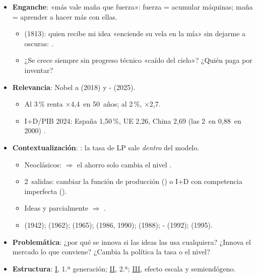 \documentclass{article}
\begin{document}
\cabecerarepaso
\begin{columnas}

\begin{itemize}
\item \textbf{Enganche}: «más vale maña que fuerza»: fuerza = acumular máquinas; maña = aprender a hacer más con ellas.
  \begin{itemize}
  \item {} (1813): quien recibe mi idea «enciende su vela en la mía» sin dejarme a oscuras: .
  \item ¿Se crece siempre sin progreso técnico «caído del cielo»? ¿Quién paga por inventar?
  \end{itemize}
\item \textbf{Relevancia}: Nobel a  (2018) y - (2025).
  \begin{itemize}
  \item Al 3\,\% renta ×4,4~en 50~años; al 2\,\%, ×2,7.
  \item I+D/PIB 2024: España 1,50\,\%, UE 2,26, China 2,69 (las 2~en 0,88~en 2000) .
  \end{itemize}
\item \textbf{Contextualización}: : la tasa de LP sale \emph{dentro} del modelo.
  \begin{itemize}
  \item Neoclásicos:  $\Rightarrow$ el ahorro solo cambia el nivel .
  \item 2~salidas: cambiar la función de producción () o I+D con competencia imperfecta ().
  \item Ideas  y parcialmente  $\Rightarrow$  .
  \item {} (1942);  (1962);  (1965);  (1986, 1990);  (1988); - (1992);  (1995).
  \end{itemize}
\item \textbf{Problemática}: ¿por qué se innova si las ideas las usa cualquiera? ¿Innova el mercado lo que conviene? ¿Cambia la política la tasa o el nivel?
\item \textbf{Estructura}: \hyperref[rep:I]{I}, 1.ª generación; \hyperref[rep:II]{II}, 2.ª; \hyperref[rep:III]{III}, efecto escala y semiendógeno.

\end{itemize}
\end{columnas}
\end{document}
